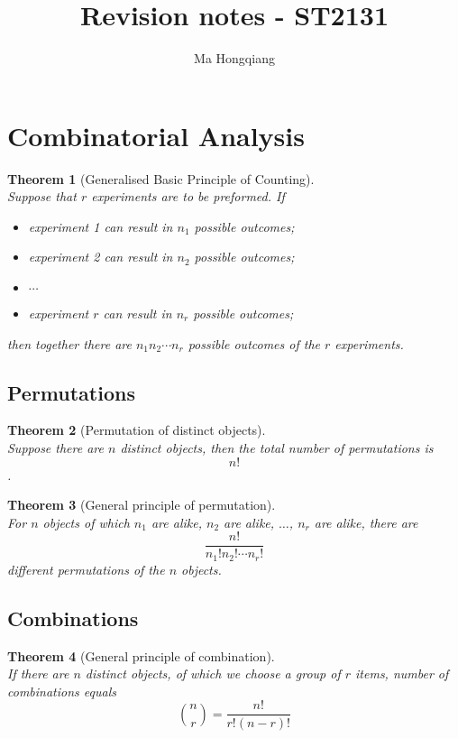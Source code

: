 \documentclass[12pt]{article}
\newtheorem{theorem}{Theorem}[section]
\theoremstyle{definition}
\begin{document}
\title{Revision notes - ST2131}
\author{Ma Hongqiang}
\maketitle
\tableofcontents

\clearpage

\section{Combinatorial Analysis}
\begin{theorem}[Generalised Basic Principle of Counting]
\hfill\\
\normalfont Suppose that $r$ experiments are to be preformed. If
\begin{itemize}
\item experiment 1 can result in $n_1$ possible outcomes;
\item experiment 2 can result in $n_2$ possible outcomes;
\item $\cdots$
\item experiment $r$ can result in $n_r$ possible outcomes;
\end{itemize}
then together there are $n_1 n_2 \cdots n_r$ possible outcomes of the $r$ experiments.
\end{theorem}
\subsection{Permutations}
\begin{theorem}[Permutation of distinct objects]
\hfill\\
\normalfont Suppose there are $n$ distinct objects, then the total number of permutations is 
\[n!\].
\end{theorem}
\begin{theorem}[General principle of permutation]
\hfill\\
\normalfont For $n$ objects of which $n_1$ are alike, $n_2$ are alike, $\ldots$, $n_r$ are alike, there are
\[
\frac{n!}{n_1!n_2!\cdots n_r!}
\]
different permutations of the $n$ objects.
\end{theorem}
\subsection{Combinations}
\begin{theorem}[General principle of combination]
\hfill\\
\normalfont If there are $n$ distinct objects, of which we choose a group of $r$ items, number of combinations equals
\[
\binom{n}{r}=\frac{n!}{r!(n-r)!}
\]
\end{theorem}
\end{document}
